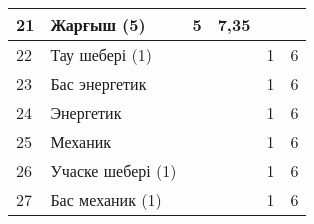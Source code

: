 \begin{longtable}[c]{|llllll|}
\multicolumn{1}{|l|}{21} & \multicolumn{1}{p{0.5\textwidth}|}{Жарғыш (5)} & \multicolumn{1}{l|}{5} & \multicolumn{1}{l|}{7,35} & \multicolumn{1}{l|}{} &  \\ \hline
\multicolumn{1}{|l|}{22} & \multicolumn{1}{p{0.5\textwidth}|}{Тау шебері (1)} & \multicolumn{1}{l|}{} & \multicolumn{1}{l|}{} & \multicolumn{1}{l|}{1} & 6 \\ \hline
\multicolumn{1}{|l|}{23} & \multicolumn{1}{p{0.5\textwidth}|}{Бас энергетик} & \multicolumn{1}{l|}{} & \multicolumn{1}{l|}{} & \multicolumn{1}{l|}{1} & 6 \\ \hline
\multicolumn{1}{|l|}{24} & \multicolumn{1}{p{0.5\textwidth}|}{Энергетик} & \multicolumn{1}{l|}{} & \multicolumn{1}{l|}{} & \multicolumn{1}{l|}{1} & 6 \\ \hline
\multicolumn{1}{|l|}{25} & \multicolumn{1}{p{0.5\textwidth}|}{Механик} & \multicolumn{1}{l|}{} & \multicolumn{1}{l|}{} & \multicolumn{1}{l|}{1} & 6 \\ \hline
\multicolumn{1}{|l|}{26} & \multicolumn{1}{p{0.5\textwidth}|}{Учаске шебері (1)} & \multicolumn{1}{l|}{} & \multicolumn{1}{l|}{} & \multicolumn{1}{l|}{1} & 6 \\ \hline
\multicolumn{1}{|l|}{27} & \multicolumn{1}{p{0.5\textwidth}|}{Бас механик (1)} & \multicolumn{1}{l|}{} & \multicolumn{1}{l|}{} & \multicolumn{1}{l|}{1} & 6 \\ \hline
\end{longtable}

